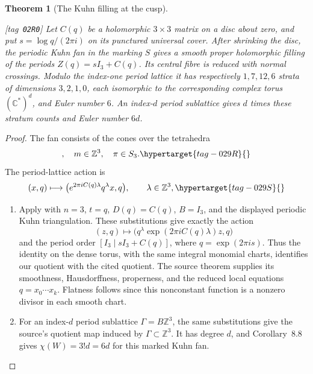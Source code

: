 \documentclass[11pt,a4paper]{article}
\numberwithin{equation}{section}
\newtheorem{theorem}{Theorem}[section]
\theoremstyle{definition}
\newcommand{\StatementRecord}[4]{{\upshape\footnotesize[tag~\texttt{#3}]}\enspace\ignorespaces}
\begin{document}
\begin{theorem}[The Kuhn filling at the cusp]\hypertarget{tag-02R0}{}\label{night:P1.9}
\StatementRecord{night:P1.9}{proved}{02R0}{the definitions and constructions stated in the proof}
Let $C(q)$ be a holomorphic $3\times3$ matrix on a disc about
zero, and put $s=\log q/(2\pi i)$ on its punctured universal cover.
After shrinking the disc, the periodic Kuhn fan in the marking $S$
gives a smooth proper holomorphic filling of the periods
$Z(q)=sI_3+C(q)$.  Its central fibre is reduced with normal crossings.
Modulo the index-one period lattice it has respectively $1,7,12,6$
strata of dimensions $3,2,1,0$, each isomorphic to the corresponding
complex torus $(\mathbb C^*)^d$, and Euler number $6$.
An index-$d$ period sublattice gives $d$ times these stratum counts and
Euler number $6d$.
\end{theorem}
\begin{proof}
The fan consists of the cones over the tetrahedra
\begin{equation}
 [m,m+e_{\pi_1},m+e_{\pi_1}+e_{\pi_2},m+(1,1,1)],
 \quad m\in\mathbb Z^3,\quad\pi\in S_3.
 \hypertarget{tag-029R}{}\label{maps:eq:E.4}
\end{equation}
The period-lattice action is
\begin{equation}
 (x,q)\longmapsto
 \bigl(e^{2\pi iC(q)\lambda}q^\lambda x,q\bigr),
 \qquad\lambda\in\mathbb Z^3,
 \hypertarget{tag-029S}{}\label{maps:eq:E.5}
\end{equation}

\begin{enumerate}[label=\arabic*.]
\item Apply \cite[Theorem~8.7 and Corollary~8.8, arXiv v1, pp.~57--59]{Yang2026}
with $n=3$, $t=q$, $D(q)=C(q)$, $B=I_3$, and the displayed
periodic Kuhn triangulation.  These substitutions give exactly the
action
\[
 (z,q)\longmapsto
 \bigl(q^\lambda\exp(2\pi iC(q)\lambda)z,q\bigr)
\]
and the period order $[I_3\mid sI_3+C(q)]$, where
$q=\exp(2\pi i s)$.  Thus the identity on the dense torus, with
the same integral monomial charts, identifies our quotient with
the cited quotient.  The source theorem supplies its smoothness,
Hausdorffness, properness, and the reduced local equations
$q=x_0\cdots x_k$.  Flatness follows since this nonconstant
function is a nonzero divisor in each smooth chart.
\item For an index-$d$ period sublattice $\Gamma=B\mathbb Z^3$,
the same substitutions give the source's quotient map induced
by $\Gamma\subset\mathbb Z^3$.  It has degree $d$, and
Corollary~8.8 gives $\chi(W)=3!d=6d$ for this marked Kuhn fan.
\end{enumerate}
\end{proof}
\end{document}
